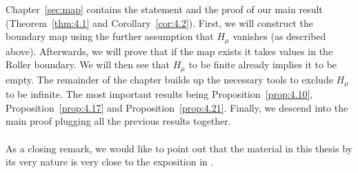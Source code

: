 Chapter~\ref{sec:map} contains the statement and the proof of our main result (Theorem~\ref{thm:4.1} and Corollary~\ref{cor:4.2}). First, we will construct the boundary map using the further assumption that \(H_\mu\) vanishes (as described above). Afterwards, we will prove that if the map exists it takes values in the Roller boundary. We will then see that \(H_\mu\) to be finite already implies it to be empty. The remainder of the chapter builds up the necessary tools to exclude \(H_\mu\) to be infinite. The most important results being Proposition~\ref{prop:4.10}, Proposition~\ref{prop:4.17} and Proposition~\ref{prop:4.21}. Finally, we descend into the main proof plugging all the previous results together.
\\
\\
As a closing remark, we would like to point out that the material in this thesis by its very nature is very close to the exposition in \textcite{MR3509968}.
